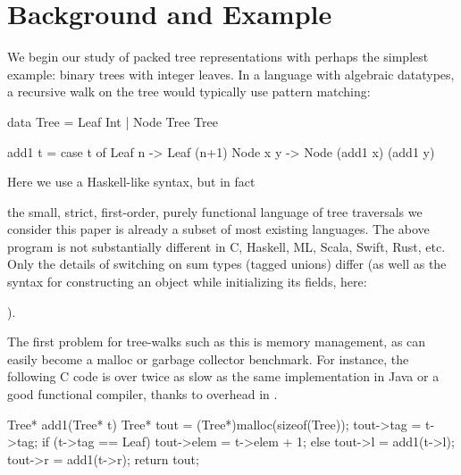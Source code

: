 \documentclass[a4paper,english]{lipics-v2016}
\newif\ifcurly
\begin{document}
\section{Background and Example}\label{sec:background}

We begin our study of packed tree representations with perhaps the
simplest example: binary trees with
integer leaves.
%
In a language with algebraic datatypes,
a recursive walk on
the tree would typically use pattern matching:

\ifcurly
\begin{code}[language=c]
type Tree = Leaf(Int) | Node(Tree,Tree);

fun add1(t) {
  match(t) {
    Leaf(n):   return Leaf(n+1);
    Node(x,y): return Node(add1(x),add1(y));
  }}
\end{code}
\else
\begin{code}
 data Tree = Leaf Int | Node Tree Tree
  
 add1 t = case t of
            Leaf n   -> Leaf (n+1)
            Node x y -> Node (add1 x) (add1 y)
\end{code}
\fi

\ifcurly
In fact,
\else
Here we use a Haskell-like syntax, but in fact
\fi
 the small, strict, first-order, purely functional language of tree traversals
we consider this paper is already a subset of most existing languages.
The above program is not substantially different in C, Haskell, ML, Scala,
Swift, Rust, etc.  Only the details of switching on sum types (tagged unions)
differ (as well as the syntax for constructing an object while initializing its
fields, here: 
\ifcurly
\il{Node(e1,e2)}).
\else
{}).
\fi


The first problem for tree-walks such as this is memory management, as 
can easily become a malloc or garbage collector benchmark.  For instance, the
following C code is over twice as slow as the same implementation in Java or a
good functional compiler, thanks to overhead in .

\begin{cpp}
  Tree* add1(Tree* t) {
    Tree* tout = (Tree*)malloc(sizeof(Tree));
    tout->tag = t->tag;
    if (t->tag == Leaf) {
      tout->elem = t->elem + 1;
    } else {
      tout->l = add1(t->l);
      tout->r = add1(t->r);
    }
    return tout;
  }
\end{cpp}
\end{document}

